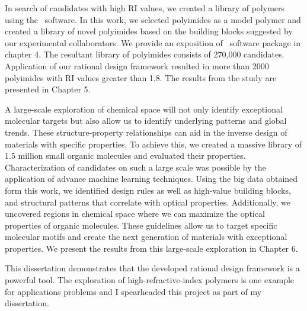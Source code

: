 In search of candidates with high RI values, we created a library of polymers using the \chemlg\ software. In this work, we selected polyimides as a model polymer and created a library of novel polyimides based on the building blocks suggested by our experimental collaborators. We provide an exposition of \chemlg\ software package in chapter 4. The resultant library of polyimides consists of 270,000 candidates. Application of our rational design framework resulted in more than 2000 polyimides with RI values greater than 1.8. The results from the study are presented in Chapter 5.

A large-scale exploration of chemical space will not only identify exceptional molecular targets but also allow us to identify underlying patterns and global trends. These structure-property relationships can aid in the inverse design of materials with specific properties. To achieve this, we created a massive library of 1.5 million small organic molecules and evaluated their properties. Characterization of candidates on such a large scale was possible by the application of advance machine learning techniques. Using the big data obtained form this work, we identified design rules as well as high-value building blocks, and structural patterns that correlate with optical properties. Additionally, we uncovered regions in chemical space where we can maximize the optical properties of organic molecules. These guidelines allow us to target specific molecular motifs and create the next generation of materials with exceptional properties. We present the results from this large-scale exploration in Chapter 6.

This dissertation demonstrates that the developed rational design framework is a powerful tool. The exploration of high-refractive-index polymers is one example for applications problems and I spearheaded this project as part of my dissertation.
